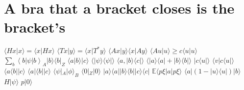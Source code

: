 \documentclass{article}
\begin{document}
\section{A bra that a bracket closes is the bracket's}
$\langle Hx|x\rangle=\langle x|Hx\rangle$ $\langle Tx|y\rangle=\langle x|T^{*}y\rangle$ $\langle Ax|y\rangle\langle x|Ay\rangle$
$\langle Au|u\rangle\geq c\langle u|u\rangle$ $\sum_b\left\langle b\right|\psi\left|b\right\rangle_{A}|b\rangle\langle b|_Z$
$\langle a|b\rangle|c\rangle$ $\langle|\psi\rangle\langle\psi|\rangle$ $\langle a,|b\rangle\langle c|\rangle$
$\langle|a\rangle\langle a|+|b\rangle\langle b|\rangle$ $|c\langle u|\rangle$ $\langle v|c\langle u|\rangle$ $\langle a\langle b||c\rangle$
$\langle a|\langle b||c\rangle$ $\langle\psi|_A|\phi\rangle_B$ $\langle 0|_Z|0\rangle$ $|a\rangle\langle a||b\rangle\langle b||c\rangle\langle c|$
$\mathbb{E}\langle p\xi|a|p\xi\rangle$ $\langle a|(1-|u\rangle\langle u|)|b\rangle$ $H|\psi\rangle$ $p|0\rangle$


\end{document}
